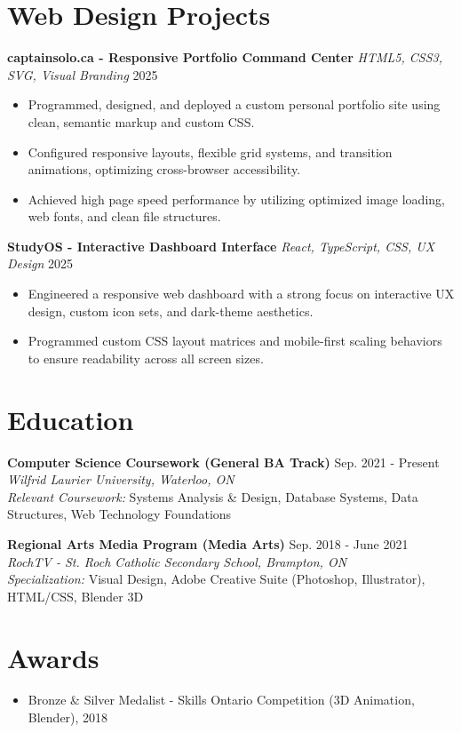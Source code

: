\documentclass[a4paper,10pt]{article}
\begin{document}
\section*{Web Design Projects}
\textbf{captainsolo.ca - Responsive Portfolio Command Center} \enspace\textbar\enspace \textit{HTML5, CSS3, SVG, Visual Branding} \hfill 2025 \\
\begin{itemize}
    \item Programmed, designed, and deployed a custom personal portfolio site using clean, semantic markup and custom CSS.
    \item Configured responsive layouts, flexible grid systems, and transition animations, optimizing cross-browser accessibility.
    \item Achieved high page speed performance by utilizing optimized image loading, web fonts, and clean file structures.
\end{itemize}

\vspace{3pt}
\textbf{StudyOS - Interactive Dashboard Interface} \enspace\textbar\enspace \textit{React, TypeScript, CSS, UX Design} \hfill 2025 \\
\begin{itemize}
    \item Engineered a responsive web dashboard with a strong focus on interactive UX design, custom icon sets, and dark-theme aesthetics.
    \item Programmed custom CSS layout matrices and mobile-first scaling behaviors to ensure readability across all screen sizes.
\end{itemize}

\section*{Education}
\textbf{Computer Science Coursework (General BA Track)} \hfill Sep. 2021 - Present \\
\textit{Wilfrid Laurier University, Waterloo, ON} \\
\textit{Relevant Coursework:} Systems Analysis \& Design, Database Systems, Data Structures, Web Technology Foundations

\vspace{3pt}
\textbf{Regional Arts Media Program (Media Arts)} \hfill Sep. 2018 - June 2021 \\
\textit{RochTV - St. Roch Catholic Secondary School, Brampton, ON} \\
\textit{Specialization:} Visual Design, Adobe Creative Suite (Photoshop, Illustrator), HTML/CSS, Blender 3D

\section*{Awards}
\begin{itemize}
    \item Bronze \& Silver Medalist - Skills Ontario Competition (3D Animation, Blender), 2018
\end{itemize}
\end{document}
